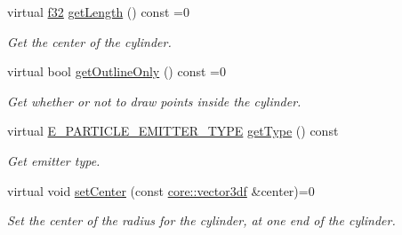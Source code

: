 \begin{DoxyCompactItemize}
\mbox{\label{classirr_1_1scene_1_1IParticleCylinderEmitter_aa69c1478e4b472fbd7940ec6042d7ee8}} 
virtual \hyperlink{namespaceirr_a0277be98d67dc26ff93b1a6a1d086b07}{f32} \hyperlink{classirr_1_1scene_1_1IParticleCylinderEmitter_aa69c1478e4b472fbd7940ec6042d7ee8}{get\+Length} () const =0
\begin{DoxyCompactList}\small\item\em Get the center of the cylinder. \end{DoxyCompactList}\item 
\mbox{\label{classirr_1_1scene_1_1IParticleCylinderEmitter_a624cebc97c4984a6d713d5ae1efe2d8e}} 
virtual bool \hyperlink{classirr_1_1scene_1_1IParticleCylinderEmitter_a624cebc97c4984a6d713d5ae1efe2d8e}{get\+Outline\+Only} () const =0
\begin{DoxyCompactList}\small\item\em Get whether or not to draw points inside the cylinder. \end{DoxyCompactList}\item 
\mbox{\label{classirr_1_1scene_1_1IParticleCylinderEmitter_a644dc9a329d371cc0c1f92212c4f2c60}} 
virtual \hyperlink{namespaceirr_1_1scene_a3e251a881c886884a78adea2e546272b}{E\+\_\+\+P\+A\+R\+T\+I\+C\+L\+E\+\_\+\+E\+M\+I\+T\+T\+E\+R\+\_\+\+T\+Y\+PE} \hyperlink{classirr_1_1scene_1_1IParticleCylinderEmitter_a644dc9a329d371cc0c1f92212c4f2c60}{get\+Type} () const
\begin{DoxyCompactList}\small\item\em Get emitter type. \end{DoxyCompactList}\item 
\mbox{\label{classirr_1_1scene_1_1IParticleCylinderEmitter_a93e13715b485cc732e11d1e551b6fd97}} 
virtual void \hyperlink{classirr_1_1scene_1_1IParticleCylinderEmitter_a93e13715b485cc732e11d1e551b6fd97}{set\+Center} (const \hyperlink{namespaceirr_1_1core_ae6e2b2a6c552833ebbd5b7463d03586b}{core\+::vector3df} \&center)=0
\begin{DoxyCompactList}\small\item\em Set the center of the radius for the cylinder, at one end of the cylinder. \end{DoxyCompactList}\item 

\end{DoxyCompactItemize}
